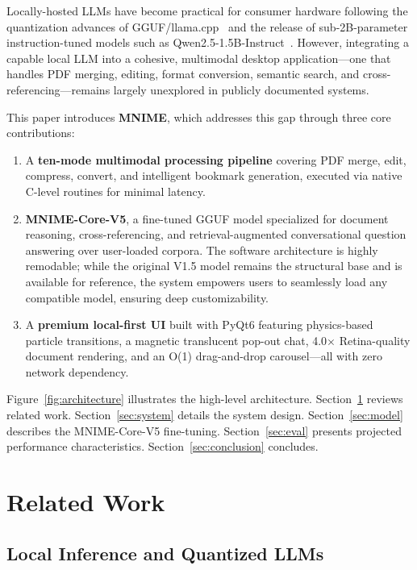 \documentclass[11pt]{article}
\begin{document}
Locally-hosted LLMs have become practical for consumer hardware following
the quantization advances of GGUF/llama.cpp~\cite{llama_cpp2023} and the
release of sub-2B-parameter instruction-tuned models such as
Qwen2.5-1.5B-Instruct~\cite{qwen2025}.
However, integrating a capable local LLM into a cohesive, multimodal desktop
application---one that handles PDF merging, editing, format conversion,
semantic search, and cross-referencing---remains largely unexplored in
publicly documented systems.

This paper introduces \textbf{MNIME}, which addresses this gap through three
core contributions:
\begin{enumerate}
    \item A \textbf{ten-mode multimodal processing pipeline} covering
    PDF merge, edit, compress, convert, and intelligent bookmark generation,
    executed via native C-level routines for minimal latency.
    \item \textbf{MNIME-Core-V5}, a fine-tuned GGUF model
    specialized for document reasoning, cross-referencing, and
    retrieval-augmented conversational question answering over user-loaded
    corpora. The software architecture is highly remodable; while the original V1.5 model remains the structural base and is available for reference, the system empowers users to seamlessly load any compatible model, ensuring deep customizability.
    \item A \textbf{premium local-first UI} built with PyQt6 featuring
    physics-based particle transitions, a magnetic translucent pop-out chat,
    4.0$\times$ Retina-quality document rendering, and an O(1) drag-and-drop
    carousel---all with zero network dependency.
\end{enumerate}

Figure~\ref{fig:architecture} illustrates the high-level architecture.
Section~\ref{sec:related} reviews related work.
Section~\ref{sec:system} details the system design.
Section~\ref{sec:model} describes the MNIME-Core-V5 fine-tuning.
Section~\ref{sec:eval} presents projected performance characteristics.
Section~\ref{sec:conclusion} concludes.

\section{Related Work}
\label{sec:related}

\subsection{Local Inference and Quantized LLMs}
\end{document}
